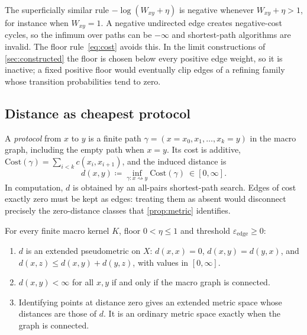 \documentclass[11pt]{article}
\begin{document}
\begin{remark}
The superficially similar rule $-\log(W_{xy}+\eta)$ is negative whenever $W_{xy}+\eta>1$, for instance when $W_{xy}=1$.
A negative undirected edge creates negative-cost cycles, so the infimum over paths can be $-\infty$ and shortest-path algorithms are invalid.
The floor rule~\eqref{eq:cost} avoids this.
In the limit constructions of \cref{sec:constructed} the floor is chosen below every positive edge weight, so it is inactive; a fixed positive floor would eventually clip edges of a refining family whose transition probabilities tend to zero.
\end{remark}

\subsection{Distance as cheapest protocol}

A \emph{protocol} from $x$ to $y$ is a finite path $\gamma=(x=x_0,x_1,\dots,x_k=y)$ in the macro graph, including the empty path when $x=y$.
Its cost is additive, $\mathrm{Cost}(\gamma)=\sum_{i<k}c(x_i,x_{i+1})$, and the induced distance is
\begin{equation}
d(x,y)\coloneqq \inf_{\gamma\colon x\rightsquigarrow y}\mathrm{Cost}(\gamma)\ \in[0,\infty].
\label{eq:path-metric}
\end{equation}
In computation, $d$ is obtained by an all-pairs shortest-path search.
Edges of cost exactly zero must be kept as edges: treating them as absent would disconnect precisely the zero-distance classes that \cref{prop:metric} identifies.

\begin{proposition}
\label{prop:metric}
For every finite macro kernel $K$, floor $0<\eta\le1$ and threshold $\varepsilon_{\mathrm{edge}}\ge0$:
\begin{enumerate}[label=(\roman*)]
\item $d$ is an extended pseudometric on $X$: $d(x,x)=0$, $d(x,y)=d(y,x)$, and $d(x,z)\le d(x,y)+d(y,z)$, with values in $[0,\infty]$.
\item $d(x,y)<\infty$ for all $x,y$ if and only if the macro graph is connected.
\item Identifying points at distance zero gives an extended metric space whose distances are those of $d$.
It is an ordinary metric space exactly when the graph is connected.
\end{enumerate}
\end{proposition}
\end{document}
